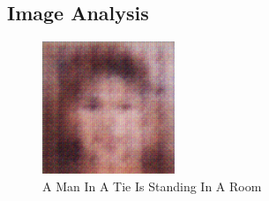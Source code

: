 \documentclass{article}%
\begin{document}
%
\subsection{Image Analysis}%
\label{subsec:ImageAnalysis}%


\begin{figure}[h!]%
\centering%
\includegraphics[width=150px]{500_fake_images/samples_5_329.png}%
\caption{A Man In A Tie Is Standing In A Room}%
\end{figure}

%
\end{document}
